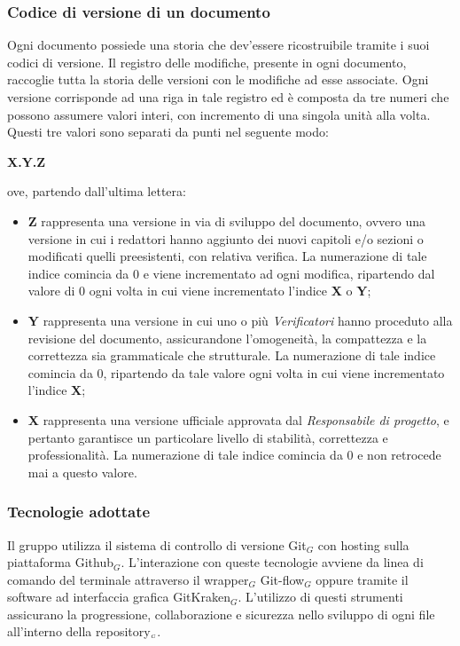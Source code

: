 \subsubsection{Codice di versione di un documento}\label{ProcessiDiSupportoGestioneDellaConfigurazioneVersionamentoCodiceDiVersioneDiUnDocumento}
Ogni documento possiede una storia che dev'essere ricostruibile tramite i suoi codici di versione.
Il registro delle modifiche, presente in ogni documento, raccoglie tutta la storia delle versioni con le modifiche ad esse associate.
Ogni versione corrisponde ad una riga in tale registro ed è composta da tre numeri che possono assumere valori interi, con incremento di una singola unità alla volta. Questi tre valori sono separati da punti nel seguente modo:
\begin{center}
	\textbf{X.Y.Z}
\end{center}
ove, partendo dall'ultima lettera:
\begin{itemize}
  \item \textbf{Z} rappresenta una versione in via di sviluppo del documento, ovvero una versione in cui i redattori hanno aggiunto dei nuovi capitoli e/o sezioni o modificati quelli preesistenti, con relativa verifica. La numerazione di tale indice comincia da 0 e viene incrementato ad ogni modifica, ripartendo dal valore di 0 ogni volta in cui viene incrementato l'indice \textbf{X} o \textbf{Y};
  \item \textbf{Y} rappresenta una versione in cui uno o più \textit{Verificatori} hanno proceduto alla revisione del documento, assicurandone l'omogeneità, la compattezza e  la correttezza sia grammaticale che strutturale. La numerazione di tale indice comincia da 0, ripartendo da tale valore ogni volta in cui viene incrementato l'indice \textbf{X}; 
  \item \textbf{X} rappresenta una versione ufficiale approvata dal \textit{Responsabile di progetto}, e pertanto garantisce un particolare livello di stabilità, correttezza e professionalità. La numerazione di tale indice comincia da 0 e non retrocede mai a questo valore. 
\end{itemize}
\begin{comment}Queste variabili assumono valori interi partendo da 0 con incremento di una singola unità alla volta.
Ad ogni incremento di una variabile tutte quelle alla sua destra vengono nuovamente azzerate.
\end{comment}
\subsubsection{Tecnologie adottate}\label{ProcessiDiSupportoGestioneDellaConfigurazioneVersionamentoTecnologieAdottate}
Il gruppo utilizza il sistema di controllo di versione Git$_G$ con hosting sulla piattaforma Github$_G$.
L'interazione con queste tecnologie avviene da linea di comando del terminale attraverso il wrapper$_G$ Git-flow$_G$ oppure tramite il software ad interfaccia grafica GitKraken$_G$.
L'utilizzo di questi strumenti assicurano la progressione, collaborazione e sicurezza nello sviluppo di ogni file all'interno della repository$_{\scaleto{G}{3pt}}$.

